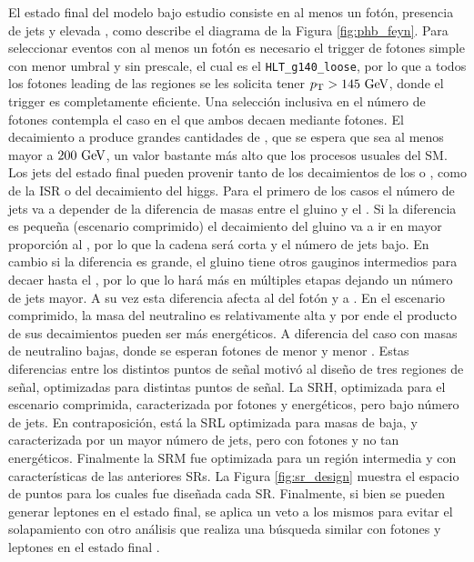 El estado final del modelo bajo estudio consiste en al menos un fotón, presencia de jets y elevada \met, como describe el diagrama de la Figura \ref{fig:phb_feyn}. Para seleccionar eventos con al menos un fotón es necesario el trigger de fotones simple con menor umbral y sin prescale, el cual es el \texttt{HLT\_g140\_loose}, por lo que a todos los fotones leading de las regiones se les solicita tener $p_{\text{T}}>145\ \text{GeV}$, donde el trigger es completamente eficiente. Una selección inclusiva en el número de fotones contempla el caso en el que ambos \ninoone decaen mediante fotones. El decaimiento a \gravino produce grandes cantidades de \met, que se espera que sea al menos mayor a $200\ \text{GeV}$, un valor bastante más alto que los procesos usuales del SM. Los jets del estado final pueden provenir tanto de los decaimientos de los \chinoonepm o \ninotwo, como de la ISR o del decaimiento del higgs. Para el primero de los casos el número de jets va a depender de la diferencia de masas entre el gluino y el \ninoone. Si la diferencia es pequeña (escenario comprimido) el decaimiento del gluino va a ir en mayor proporción al \ninoone, por lo que la cadena será corta y el número de jets bajo. En cambio si la diferencia es grande, el gluino tiene otros gauginos intermedios para decaer hasta el \ninoone, por lo que lo hará más en múltiples etapas dejando un número de jets mayor. A su vez esta diferencia afecta al \pt del fotón y a \met. En el escenario comprimido, la masa del neutralino es relativamente alta y por ende el producto de sus decaimientos pueden ser más energéticos. A diferencia del caso con masas de neutralino bajas, donde se esperan fotones de menor \pt y menor \met. Estas diferencias entre los distintos puntos de señal motivó al diseño de tres regiones de señal, optimizadas para distintas puntos de señal. La SRH, optimizada para el escenario comprimida, caracterizada por fotones y \met energéticos, pero bajo número de jets. En contraposición, está la SRL optimizada para masas de \ninoone baja, y caracterizada por un mayor número de jets, pero con fotones y \met no tan energéticos. Finalmente la SRM fue optimizada para un región intermedia y con características de las anteriores SRs. La Figura \ref{fig:sr_design}  muestra el espacio de puntos para los cuales fue diseñada cada SR. Finalmente, si bien se pueden generar leptones en el estado final, se aplica un veto a los mismos para evitar el solapamiento con otro análisis que realiza una búsqueda similar con fotones y leptones en el estado final \cite{diph_8TeV}.

